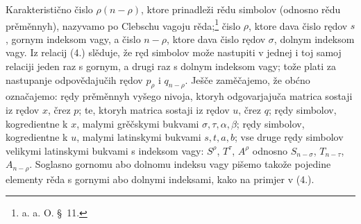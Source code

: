 \documentclass[11pt]{article}
\begin{document}
Karakteristično čislo $\rho(n-\rho)$, ktore prinadleži rědu simbolov (odnosno rědu prěměnnyh), nazyvamo po Clebschu vagoju rěda;\footnote{a. a. O. \S\ 11.} čislo $\rho$, ktore dava čislo rędov $s$, gornym indeksom vagy, a čislo $n-\rho$, ktore dava čislo rędov $\sigma$, dolnym indeksom vagy. Iz relacij (4.) slěduje, že ręd simbolov može nastupiti v jednej i toj samoj relaciji jeden raz s gornym, a drugi raz s dolnym indeksom vagy; tože plati za nastupanje odpovědajučih rędov $p_\rho$ i $q_{n-\rho}$. Ješče zaměčajemo, že obćno označajemo: rędy prěměnnyh vyšego nivoja, ktoryh odgovarjajuča matrica sostaji iz rędov $x$, črez $p$; te, ktoryh matrica sostaji iz rędov $u$, črez $q$; rędy simbolov, kogredientne k $x$, malymi grěčskymi bukvami $\sigma,\tau,\alpha,\beta$; rędy simbolov, kogredientne k $u$, malymi latinskymi bukvami $s,t,a,b$; vse druge rędy simbolov velikymi latinskymi bukvami s indeksom vagy: $S^\rho$, $T^\tau$, $A^\rho$ odnosno $S_{n-\sigma}$, $T_{n-\tau}$, $A_{n-\rho}$. Soglasno gornomu abo dolnomu indeksu vagy pišemo takože pojedine elementy rěda s gornymi abo dolnymi indeksami, kako na primjer v (4.).
\end{document}
